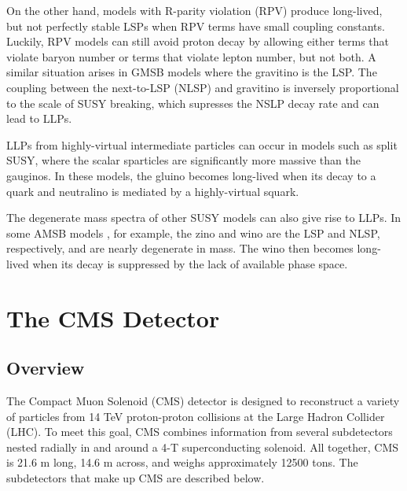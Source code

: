 \documentclass[12pt]{article}
\begin{document}
    On the other hand, models with R-parity violation (RPV) produce long-lived, but not perfectly stable LSPs when RPV terms have small coupling constants. Luckily, RPV models can still avoid proton decay by allowing either terms that violate baryon number or terms that violate lepton number, but not both. A similar situation arises in GMSB models where the gravitino is the LSP. The coupling between the next-to-LSP (NLSP) and gravitino is inversely proportional to the scale of SUSY breaking, which supresses the NSLP decay rate and can lead to LLPs. 

    LLPs from highly-virtual intermediate particles can occur in models such as split SUSY, where the scalar sparticles are significantly more massive than the gauginos. In these models, the gluino becomes long-lived when its decay to a quark and neutralino is mediated by a highly-virtual squark.  

     The degenerate mass spectra of other SUSY models can also give rise to LLPs. In some AMSB models , for example, the zino and wino are the LSP and NLSP, respectively, and are nearly degenerate in mass. The wino then becomes long-lived when its decay is suppressed by the lack of available phase space. 

\section{The CMS Detector}
\subsection{Overview}
    The Compact Muon Solenoid (CMS) detector is designed to reconstruct a variety of particles from 14 TeV proton-proton collisions at the Large Hadron Collider (LHC). To meet this goal, CMS combines information from several subdetectors nested radially in and around a 4-T superconducting solenoid. All together, CMS is 21.6 m long, 14.6 m across, and weighs approximately 12500 tons. The subdetectors that make up CMS are described below.
\end{document}

